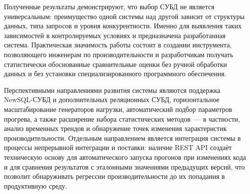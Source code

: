 Полученные результаты демонстрируют, что выбор СУБД не является универсальным: преимущество одной системы над другой зависит от структуры данных, типа запросов и уровня конкурентности. Именно для выявления таких зависимостей в контролируемых условиях и предназначена разработанная система. Практическая значимость работы состоит в создании инструмента, позволяющего инженерам по производительности и разработчикам получать статистически обоснованные сравнительные оценки без ручной обработки данных и без установки специализированного программного обеспечения.

Перспективными направлениями развития системы являются поддержка NewSQL-СУБД и дополнительных реляционных СУБД, горизонтальное масштабирование генераторов нагрузки, автоматический подбор параметров прогрева, а также расширение набора статистических методов~--- в частности, анализ временных трендов и обнаружение точек изменения характеристик производительности. Отдельным направлением является интеграция системы в процессы непрерывной интеграции и поставки: наличие REST API создаёт техническую основу для автоматического запуска прогонов при изменениях кода и для сравнения результатов с эталонными значениями предыдущих версий, что позволит обнаруживать регрессии производительности до их попадания в продуктивную среду.
